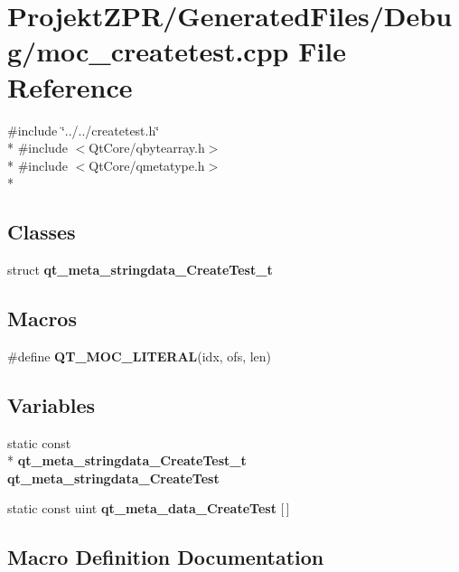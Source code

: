 \section{Projekt\-Z\-P\-R/\-Generated\-Files/\-Debug/moc\-\_\-createtest.cpp File Reference}
\label{_debug_2moc__createtest_8cpp}
{\ttfamily \#include \char`\"{}../../createtest.\-h\char`\"{}}\\*
{\ttfamily \#include $<$Qt\-Core/qbytearray.\-h$>$}\\*
{\ttfamily \#include $<$Qt\-Core/qmetatype.\-h$>$}\\*
\subsection*{Classes}
\begin{DoxyCompactItemize}
\item 
struct {\bf qt\-\_\-meta\-\_\-stringdata\-\_\-\-Create\-Test\-\_\-t}
\end{DoxyCompactItemize}
\subsection*{Macros}
\begin{DoxyCompactItemize}
\item 
\#define {\bf Q\-T\-\_\-\-M\-O\-C\-\_\-\-L\-I\-T\-E\-R\-A\-L}(idx, ofs, len)
\end{DoxyCompactItemize}
\subsection*{Variables}
\begin{DoxyCompactItemize}
\item 
static const \\*
{\bf qt\-\_\-meta\-\_\-stringdata\-\_\-\-Create\-Test\-\_\-t} {\bf qt\-\_\-meta\-\_\-stringdata\-\_\-\-Create\-Test}
\item 
static const uint {\bf qt\-\_\-meta\-\_\-data\-\_\-\-Create\-Test} [$\,$]
\end{DoxyCompactItemize}


\subsection{Macro Definition Documentation}

